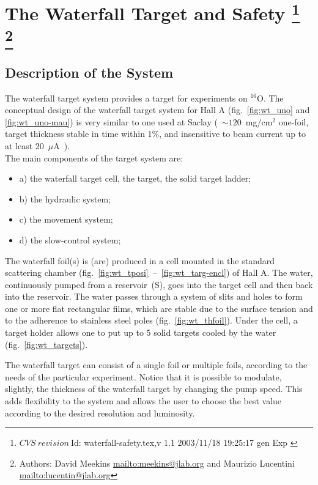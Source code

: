 \chapter[The Waterfall Target and Safety]{The Waterfall Target and Safety
\footnote{
  $CVS~revision~ $Id: waterfall-safety.tex,v 1.1 2003/11/18 19:25:17 gen Exp $ $
}
\footnote{Authors: David Meekins \url{mailto:meekins@jlab.org} and 
 Maurizio Lucentini \url{mailto:lucentin@jlab.org}}
}

\section{Description of the System}

The waterfall target system provides a target for experiments on $^{16}$O.
The conceptual design of the waterfall target system for Hall A (fig.~\ref{fig:wt_uno}
and \ref{fig:wt_uno-mau}) is very similar to one used at Saclay (~$\sim 120$~mg/cm$^{2}$
one-foil, target thickness stable in time within 1\%, and insensitive
to beam current up to at least 20~$\mu $A~\cite{Garibaldi:1992mb}).\\


The main components of the target system are: 

\begin{itemize}
\item a) the waterfall target cell, the target, the solid target ladder; 
\item b) the hydraulic system; 
\item c) the movement system; 
\item d) the slow-control system; 
\end{itemize}
The waterfall foil(s) is (are) produced in a cell mounted in the standard
scattering chamber (fig.~\ref{fig:wt_tposi}~--~\ref{fig:wt_targ-encl}) of Hall
A. The water, continuously pumped from a reservoir~(S), goes into
the target cell and then back into the reservoir. The water passes
through a system of slits and holes to form one or more flat rectangular
films, which are stable due to the surface tension and to the adherence
to stainless steel poles (fig.~\ref{fig:wt_thfoil}). Under the cell, a
target holder allows one to put up to 5 solid targets cooled by the
water (fig.~\ref{fig:wt_targets}).

The waterfall target can consist of a single foil or multiple foils,
according to the needs of the particular experiment. Notice that it
is possible to modulate, slightly, the thickness of the waterfall
target by changing the pump speed. This adds flexibility to the system
and allows the user to choose the best value according to the desired
resolution and luminosity.

